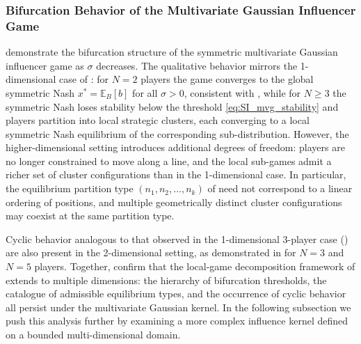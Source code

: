 \documentclass{article}
\begin{document}
\subsubsection{Bifurcation Behavior of the Multivariate Gaussian Influencer Game}\label{subsubsec:SI_mvg_bifurcation}
     demonstrate the bifurcation structure of the symmetric multivariate Gaussian influencer game as $\sigma$ decreases. The qualitative behavior mirrors the 1-dimensional case of : for $N = 2$ players the game converges to the global symmetric Nash $x^* = \mathbb{E}_B[b]$ for all $\sigma > 0$, consistent with , while for $N \geq 3$ the symmetric Nash loses stability below the threshold \cref{eq:SI_mvg_stability} and players partition into local strategic clusters, each converging to a local symmetric Nash equilibrium of the corresponding sub-distribution. However, the higher-dimensional setting introduces additional degrees of freedom: players are no longer constrained to move along a line, and the local sub-games admit a richer set of cluster configurations than in the 1-dimensional case. In particular, the equilibrium partition type $(n_1, n_2, \ldots, n_k)$ of  need not correspond to a linear ordering of positions, and multiple geometrically distinct cluster configurations may coexist at the same partition type.

    Cyclic behavior analogous to that observed in the 1-dimensional 3-player case () are also present in the 2-dimensional setting, as demonstrated in  for $N = 3$ and $N = 5$ players. Together,  confirm that the local-game decomposition framework of  extends to multiple dimensions: the hierarchy of bifurcation thresholds, the catalogue of admissible equilibrium types, and the occurrence of cyclic behavior all persist under the multivariate Gaussian kernel. In the following subsection we push this analysis further by examining a more complex influence kernel defined on a bounded multi-dimensional domain.
\end{document}
